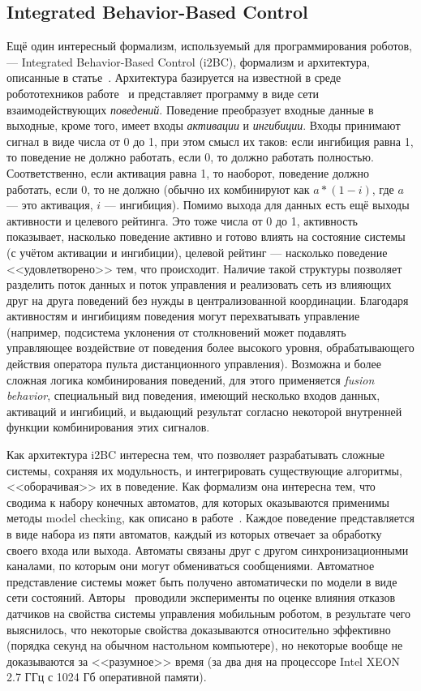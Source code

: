 \documentclass[a4, 14pt]{article}
\begin{document}
\subsection{Integrated Behavior-Based Control}
Ещё один интересный формализм, используемый для программирования роботов, --- 
Integrated Behavior-Based Control (i2BC), формализм и архитектура, описанные в 
статье~\cite{proetzsch2007i2bc}. Архитектура базируется на известной в среде 
робототехников работе~\cite{brooks1986layered} и представляет программу в виде 
сети взаимодействующих \textit{поведений}. Поведение преобразует входные данные в 
выходные, кроме того, имеет входы \textit{активации} и \textit{ингибиции}. Входы 
принимают сигнал в виде числа от 0 до 1, при этом смысл их таков: если ингибиция равна 1, то 
поведение не должно работать, если 0, то должно работать полностью. 
Соответственно, если активация равна 1, то наоборот, поведение должно работать, 
если 0, то не должно (обычно их комбинируют как $a * (1 - i)$, где $a$ --- это 
активация, $i$ --- ингибиция). Помимо выхода для данных есть ещё выходы 
активности и целевого рейтинга. Это тоже числа от 0 до 1, активность показывает, 
насколько поведение активно и готово влиять на состояние системы (с учётом 
активации и ингибиции), целевой рейтинг --- насколько поведение <<удовлетворено>> 
тем, что происходит. Наличие такой структуры позволяет разделить поток данных и 
поток управления и реализовать сеть из влияющих друг на друга поведений без 
нужды в централизованной координации. Благодаря активностям и ингибициям 
поведения могут перехватывать управление (например, подсистема уклонения от 
столкновений может подавлять управляющее воздействие от поведения более высокого 
уровня, обрабатывающего действия оператора пульта дистанционного управления). 
Возможна и более сложная логика комбинирования поведений, для этого применяется 
\textit{fusion behavior}, специальный вид поведения, имеющий несколько входов данных, 
активаций и ингибиций, и выдающий результат согласно некоторой внутренней функции 
комбинирования этих сигналов.

Как архитектура i2BC интересна тем, что позволяет разрабатывать сложные системы, 
сохраняя их модульность, и интегрировать существующие алгоритмы, <<оборачивая>> 
их в поведение. Как формализм она интересна тем, что сводима к набору конечных 
автоматов, для которых оказываются применимы методы model checking, как описано 
в работе~\cite{kiekbusch2014behaviour}. Каждое поведение представляется в виде 
набора из пяти автоматов, каждый из которых отвечает за обработку своего входа 
или выхода. Автоматы связаны друг с другом синхронизационными каналами, по 
которым они могут обмениваться сообщениями. Автоматное представление системы 
может быть получено автоматически по модели в виде сети состояний. Авторы~\cite{kiekbusch2014behaviour}
проводили эксперименты по оценке влияния отказов датчиков 
на свойства системы управления мобильным роботом, в 
результате чего выяснилось, что некоторые свойства доказываются относительно 
эффективно (порядка секунд на обычном настольном компьютере), но некоторые 
вообще не доказываются за <<разумное>> время (за два дня на процессоре 
Intel XEON 2.7 ГГц с 1024 Гб оперативной памяти).
\end{document}
